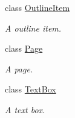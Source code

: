 \begin{DoxyCompactItemize}
class \hyperlink{class_mu_p_d_f_1_1_outline_item}{Outline\-Item}
\begin{DoxyCompactList}\small\item\em A outline item. \end{DoxyCompactList}\item 
class \hyperlink{class_mu_p_d_f_1_1_page}{Page}
\begin{DoxyCompactList}\small\item\em A page. \end{DoxyCompactList}\item 
class \hyperlink{class_mu_p_d_f_1_1_text_box}{Text\-Box}
\begin{DoxyCompactList}\small\item\em A text box. \end{DoxyCompactList}\end{DoxyCompactItemize}
